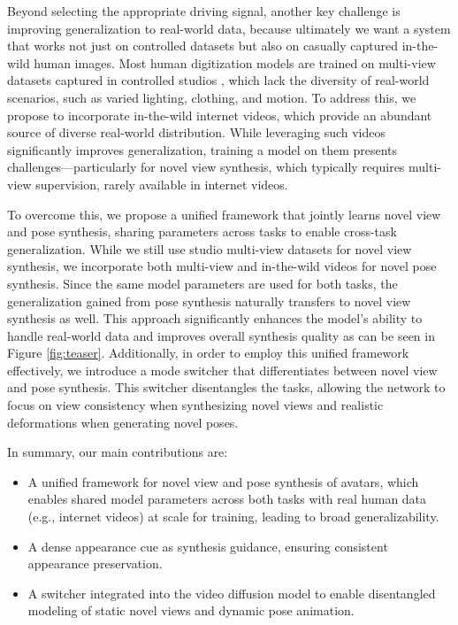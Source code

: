 Beyond selecting the appropriate driving signal, another key challenge is improving generalization to real-world data, because ultimately we want a system that works not just on controlled datasets but also on casually captured in-the-wild human images. Most human digitization models are trained on multi-view datasets captured in controlled studios \cite{kwon2021neural,kwon2023neural,hu2023sherf}, which lack the diversity of real-world scenarios, such as varied lighting, clothing, and motion. 
%
To address this, we propose to incorporate in-the-wild internet videos, which provide an abundant source of diverse real-world distribution. While leveraging such videos significantly improves generalization, training a model on them presents challenges—particularly for novel view synthesis, which typically requires multi-view supervision, rarely available in internet videos.

To overcome this, we propose a unified framework that jointly learns novel view and pose synthesis, sharing parameters across tasks to enable cross-task generalization. While we still use studio multi-view datasets for novel view synthesis, we incorporate both multi-view and in-the-wild videos for novel pose synthesis. Since the same model parameters are used for both tasks, the generalization gained from pose synthesis naturally transfers to novel view synthesis as well. This approach significantly enhances the model’s ability to handle real-world data and improves overall synthesis quality as can be seen in Figure \ref{fig:teaser}.
Additionally, in order to employ this unified framework effectively, we introduce a mode switcher that differentiates between novel view and pose synthesis. This switcher disentangles the tasks, allowing the network to focus on view consistency when synthesizing novel views and realistic deformations when generating novel poses. 


In summary, our main contributions are:
\begin{itemize}
\item A unified framework for novel view and pose synthesis of avatars, which enables shared model parameters across both tasks with real human data (e.g., internet videos) at scale for training, leading to broad generalizability.
\item A dense appearance cue as synthesis guidance, ensuring consistent appearance preservation.
\item A switcher integrated into the video diffusion model to enable disentangled modeling of static novel views and dynamic pose animation.
\end{itemize} 

